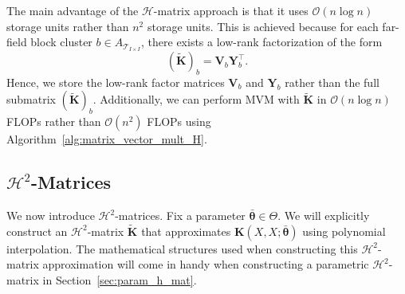 \documentclass[final,3p,times]{elsarticle}
\newcommand{\mc}[1]{\mathcal{#1}}
\renewcommand{\vec}[1]{\boldsymbol{#1}}
\newcommand{\mat}[1]{\boldsymbol{#1}}
\newcommand{\mathat}[1]{\widetilde{\boldsymbol{#1}}}
\begin{document}
The main advantage of the $\mc{H}$-matrix approach is that it uses $\mc{O}(n\log n )$ storage units rather than $n^2$ storage units. This is achieved because for each far-field block cluster $b \in A_{\mc{T}_{I \times I}}$, there exists a low-rank factorization of the form 
$$(\mathat{K})_{b} = \mat{V}_{b} \mat{Y}^{\top}_{b}.$$
Hence, we store the low-rank factor matrices $\mat{V}_{b}$ and $\mat{Y}_{b}$ rather than the full submatrix $(\mathat{K})_{b}$. Additionally, we can perform MVM with $\mathat{K}$ in $\mc{O}(n\log n)$ FLOPs rather than $\mc{O}(n^2)$ FLOPs using Algorithm~\ref{alg:matrix_vector_mult_H}. 




\subsection{\texorpdfstring{$\mc{H}^{2}$}{}-Matrices}\label{ssec:H2_mat}

We now introduce $\mc{H}^{2}$-matrices. Fix a parameter $\bar{\vec{\theta}} \in \Theta$. We will explicitly construct an $\mc{H}^{2}$-matrix $\mathat{K}$ that approximates $\mat{K}({X}, {X}; \bar{\vec{\theta}})$ using polynomial interpolation. The mathematical structures used when constructing this $\mc{H}^{2}$-matrix approximation will come in handy when constructing a parametric $\mc{H}^{2}$-matrix in Section~\ref{sec:param_h_mat}. 
\end{document}
